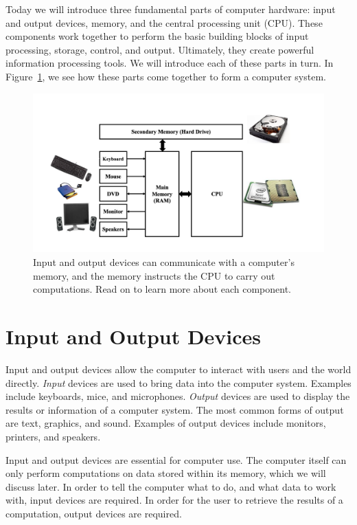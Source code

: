 Today we will introduce three fundamental parts of computer hardware: input and output devices, memory, and the central processing unit (CPU). These components work together to perform the basic building blocks of input processing, storage, control, and output. Ultimately, they create powerful information processing tools. We will introduce each of these parts in turn. In Figure~\ref{fig:hardware:overview}, we see how these parts come together to form a computer system.

\begin{figure}
	\centering
	\includegraphics[width=\textwidth]{images/cs_intro_hardware_overview.png}
	\caption{Input and output devices can communicate with a computer's memory, and the memory instructs the CPU to carry out computations. Read on to learn more about each component.
                 }
	\label{fig:hardware:overview}
\end{figure}

\section{Input and Output Devices}

Input and output  devices allow the computer to interact with users and the world directly.  \emph{Input} devices are used to bring data into the computer system. Examples include keyboards, mice, and microphones. \emph{Output} devices are used to display the results or information of a computer system. The most common forms of output are text, graphics, and sound. Examples of output devices include monitors, printers, and speakers. 

Input and output devices are essential for computer use. The computer itself can only perform computations on data stored within its memory, which we will discuss later. In order to tell the computer what to do, and what data to work with, input devices are required. In order for the user to retrieve the results of a computation, output devices are required.

